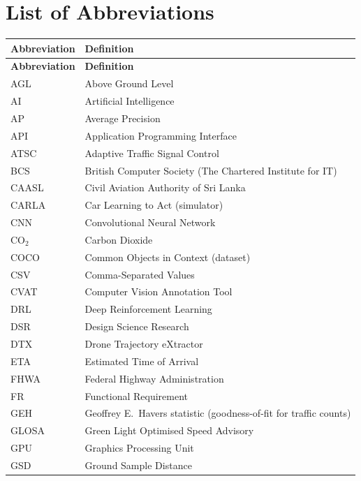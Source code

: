\chapter*{List of Abbreviations}


\renewcommand{\arraystretch}{1.15}
\begin{longtable}{@{}p{}p{}@{}}
\toprule
\textbf{Abbreviation} & \textbf{Definition}\\
\midrule
\endfirsthead
\toprule
\textbf{Abbreviation} & \textbf{Definition}\\
\midrule
\endhead
\bottomrule
\endlastfoot
AGL & Above Ground Level\\
AI & Artificial Intelligence\\
AP & Average Precision\\
API & Application Programming Interface\\
ATSC & Adaptive Traffic Signal Control\\
BCS & British Computer Society (The Chartered Institute for IT)\\
CAASL & Civil Aviation Authority of Sri Lanka\\
CARLA & Car Learning to Act (simulator)\\
CNN & Convolutional Neural Network\\
CO$_2$ & Carbon Dioxide\\
COCO & Common Objects in Context (dataset)\\
CSV & Comma-Separated Values\\
CVAT & Computer Vision Annotation Tool\\
DRL & Deep Reinforcement Learning\\
DSR & Design Science Research\\
DTX & Drone Trajectory eXtractor\\
ETA & Estimated Time of Arrival\\
FHWA & Federal Highway Administration\\
FR & Functional Requirement\\
GEH & Geoffrey E.\ Havers statistic (goodness-of-fit for traffic counts)\\
GLOSA & Green Light Optimised Speed Advisory\\
GPU & Graphics Processing Unit\\
GSD & Ground Sample Distance\\

\end{longtable}
